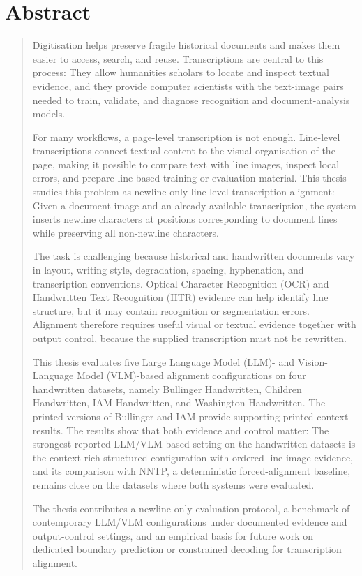 \documentclass[oneside,a4paper]{book}
\begin{document}
\hypersetup{pageanchor=false}

\clearpage
\hypersetup{pageanchor=true}
\frontmatter

\chapter*{\centering Abstract}
\begin{quotation}
\noindent
Digitisation helps preserve fragile historical documents and makes them easier to access, search, and reuse. Transcriptions are central to this process: They allow humanities scholars to locate and inspect textual evidence, and they provide computer scientists with the text-image pairs needed to train, validate, and diagnose recognition and document-analysis models.

For many workflows, a page-level transcription is not enough. Line-level transcriptions connect textual content to the visual organisation of the page, making it possible to compare text with line images, inspect local errors, and prepare line-based training or evaluation material. This thesis studies this problem as newline-only line-level transcription alignment: Given a document image and an already available transcription, the system inserts newline characters at positions corresponding to document lines while preserving all non-newline characters.

The task is challenging because historical and handwritten documents vary in layout, writing style, degradation, spacing, hyphenation, and transcription conventions. Optical Character Recognition (OCR) and Handwritten Text Recognition (HTR) evidence can help identify line structure, but it may contain recognition or segmentation errors. Alignment therefore requires useful visual or textual evidence together with output control, because the supplied transcription must not be rewritten.

This thesis evaluates five Large Language Model (LLM)- and Vision-Language Model (VLM)-based alignment configurations on four handwritten datasets, namely Bullinger Handwritten, Children Handwritten, IAM Handwritten, and Washington Handwritten. The printed versions of Bullinger and IAM provide supporting printed-context results. The results show that both evidence and control matter: The strongest reported LLM/VLM-based setting on the handwritten datasets is the context-rich structured configuration with ordered line-image evidence, and its comparison with NNTP, a deterministic forced-alignment baseline, remains close on the datasets where both systems were evaluated.

The thesis contributes a newline-only evaluation protocol, a benchmark of contemporary LLM/VLM configurations under documented evidence and output-control settings, and an empirical basis for future work on dedicated boundary prediction or constrained decoding for transcription alignment.
\end{quotation}
\clearpage
\end{document}
